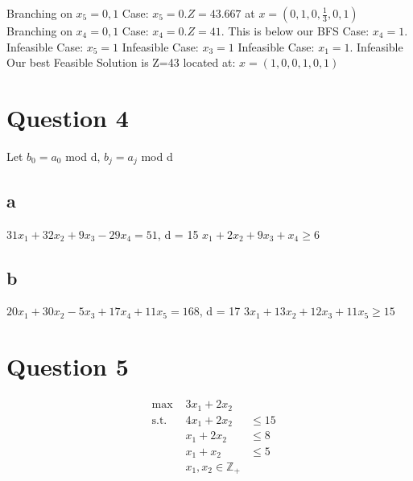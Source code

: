 \documentclass[10pt, letterpaper]{paper}
\begin{document}
\indent \indent \indent \indent Branching on $x_5 = 0,1$
\indent \indent \indent \indent \newline
\indent \indent \indent \indent \indent Case: $x_5 = 0. Z = 43.667$ at $x=(0,1,0,\frac{1}{3},0,1)$
\indent \indent \indent \indent \indent \newline
\indent \indent \indent \indent \indent Branching on $x_4 = 0,1$
\indent \indent \indent \indent \indent \newline
\indent \indent \indent \indent \indent \indent Case: $x_4 = 0. Z = 41.$ This is below our BFS
\indent \indent \indent \indent \indent \indent \newline
\indent \indent \indent \indent \indent \indent Case: $x_4 = 1.$ Infeasible
\indent \indent \indent \indent \indent \indent \newline
\indent \indent \indent \indent \indent Case: $x_5 = 1$ Infeasible
\indent \indent \indent \indent \indent \newline
\indent \indent \indent \indent Case: $x_3 = 1$ Infeasible
\indent \indent \indent \indent \newline
\indent \indent \indent Case: $x_1 = 1. $ Infeasible
\newline \newline 
Our best Feasible Solution is Z=43 located at: $x=(1,0,0,1,0,1)$


\section*{Question 4}
Let $b_0 = a_0$ mod d, $b_j = a_j$ mod d
\subsection*{a}
$31x_1 + 32x_2 + 9x_3 - 29x_4 = 51$, d = 15
\newline
$x_1 + 2x_2 + 9x_3 + x_4 \geq 6$
\subsection*{b}
$20x_1 + 30x_2 - 5x_3 + 17x_4 + 11x_5 = 168$, d = 17
\newline
$3x_1 + 13x_2 + 12x_3 + 11x_5 \geq 15$




\section*{Question 5}

\begin{equation*}
\begin{alignedat}{3}
&\text{max }&3x_1 + 2x_2&\\
&\text{s.t. } &4x_1 +2x_2&\leq 15\\
& &x_1 + 2x_2  &\leq 8\\
& &x_1 + x_2 &\leq 5\\
& &x_1,x_2 \in \mathbb{Z}_+ &\\
\end{alignedat}
\end{equation*}
\end{document}
